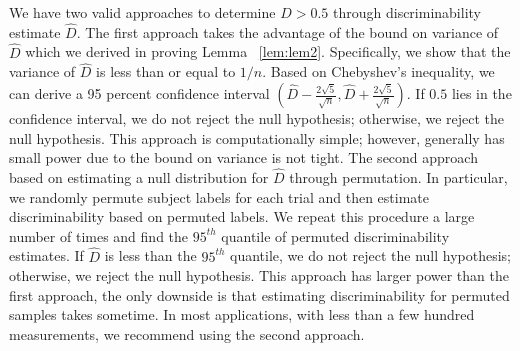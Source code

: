\documentclass{article}
\begin{document}
We have two valid approaches to determine $D > 0.5$ through discriminability estimate $\hat{D}$. The first approach takes the advantage of the bound on variance of $\hat{D}$ which we derived in proving Lemma ~\ref{lem:lem2}. Specifically, we show that the variance of $\hat{D}$ is less than or equal to $1/n$. Based on Chebyshev's inequality, we can derive a 95 percent confidence interval $(\hat{D}-\frac{2\sqrt{5}}{\sqrt{n}},\hat{D}+\frac{2\sqrt{5}}{\sqrt{n}})$. If $0.5$ lies in the confidence interval, we do not reject the null hypothesis; otherwise, we reject the null hypothesis. This approach is computationally simple; however, generally has small power due to the bound on variance is not tight. The second approach based on estimating a null distribution for $\hat{D}$ through permutation. In particular, we randomly permute subject labels for each trial and then estimate discriminability based on permuted labels. We repeat this procedure a large number of times and find the $95^{th}$ quantile of permuted discriminability estimates. If $\hat{D}$ is less than the $95^{th}$ quantile, we do not reject the null hypothesis; otherwise, we reject the null hypothesis. This approach has larger power than the first approach, the only downside is that estimating discriminability for permuted samples takes sometime. In most applications, with less than a few hundred measurements, we recommend using the second approach. 
\end{document}
